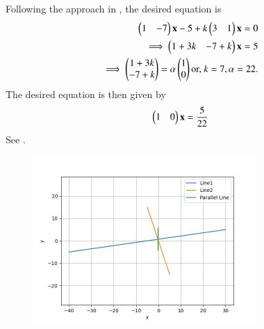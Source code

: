 		Following the approach in ,
		the desired equation is 
\begin{align}
\begin{pmatrix}	1&-7\end{pmatrix}\mathbf{x} -5
+
	k\begin{pmatrix}3&1\end{pmatrix} \mathbf{x} = 0
	\\
	\implies 
	\begin{pmatrix}	1 + 3k&-7+k\end{pmatrix} 
	 \mathbf{x} =5 
	 \\
	 \implies 
	\begin{pmatrix}	1 + 3k \\ -7+k\end{pmatrix}  = \alpha \begin{pmatrix}1 \\ 0\end{pmatrix}
	\text{or, } k = 7, \alpha =  22.
\end{align}
The desired equation is then given by 
\begin{align}
	\begin{pmatrix}1&0\end{pmatrix}\mathbf{x}=\frac{5}{22}
\end{align}
See  
.
\begin{figure}[!ht]
  \begin{center} 
      \includegraphics[width=\columnwidth]{chapters/11/10/4/6/figs/line_fig.png}
  \end{center}
\caption{}
\label{fig:chapters/11/10/4/6/Fig3}
\end{figure}
